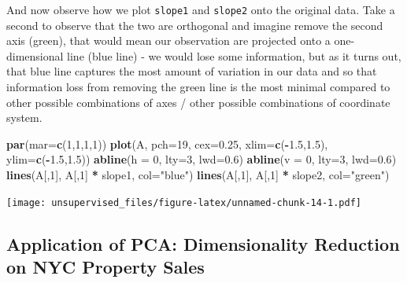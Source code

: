 \documentclass[]{article}
\newenvironment{Shaded}{\begin{snugshade}}{\end{snugshade}}
\newcommand{\DataTypeTok}[1]{\textcolor[rgb]{0.13,0.29,0.53}{#1}}
\newcommand{\DecValTok}[1]{\textcolor[rgb]{0.00,0.00,0.81}{#1}}
\newcommand{\FloatTok}[1]{\textcolor[rgb]{0.00,0.00,0.81}{#1}}
\newcommand{\KeywordTok}[1]{\textcolor[rgb]{0.13,0.29,0.53}{\textbf{#1}}}
\newcommand{\NormalTok}[1]{#1}
\newcommand{\OperatorTok}[1]{\textcolor[rgb]{0.81,0.36,0.00}{\textbf{#1}}}
\newcommand{\StringTok}[1]{\textcolor[rgb]{0.31,0.60,0.02}{#1}}
\begin{document}
And now observe how we plot \texttt{slope1} and \texttt{slope2} onto the
original data. Take a second to observe that the two are orthogonal and
imagine remove the second axis (green), that would mean our observation
are projected onto a one-dimensional line (blue line) - we would lose
some information, but as it turns out, that blue line captures the most
amount of variation in our data and so that information loss from
removing the green line is the most minimal compared to other possible
combinations of axes / other possible combinations of coordinate system.

\begin{Shaded}
\begin{Highlighting}[]
\KeywordTok{par}\NormalTok{(}\DataTypeTok{mar=}\KeywordTok{c}\NormalTok{(}\DecValTok{1}\NormalTok{,}\DecValTok{1}\NormalTok{,}\DecValTok{1}\NormalTok{,}\DecValTok{1}\NormalTok{))}
\KeywordTok{plot}\NormalTok{(A, }\DataTypeTok{pch=}\DecValTok{19}\NormalTok{, }\DataTypeTok{cex=}\FloatTok{0.25}\NormalTok{, }\DataTypeTok{xlim=}\KeywordTok{c}\NormalTok{(}\OperatorTok{-}\FloatTok{1.5}\NormalTok{,}\FloatTok{1.5}\NormalTok{), }\DataTypeTok{ylim=}\KeywordTok{c}\NormalTok{(}\OperatorTok{-}\FloatTok{1.5}\NormalTok{,}\FloatTok{1.5}\NormalTok{))}
\KeywordTok{abline}\NormalTok{(}\DataTypeTok{h =} \DecValTok{0}\NormalTok{, }\DataTypeTok{lty=}\DecValTok{3}\NormalTok{, }\DataTypeTok{lwd=}\FloatTok{0.6}\NormalTok{)}
\KeywordTok{abline}\NormalTok{(}\DataTypeTok{v =} \DecValTok{0}\NormalTok{, }\DataTypeTok{lty=}\DecValTok{3}\NormalTok{, }\DataTypeTok{lwd=}\FloatTok{0.6}\NormalTok{)}
\KeywordTok{lines}\NormalTok{(A[,}\DecValTok{1}\NormalTok{], A[,}\DecValTok{1}\NormalTok{] }\OperatorTok{*}\StringTok{ }\NormalTok{slope1, }\DataTypeTok{col=}\StringTok{"blue"}\NormalTok{)}
\KeywordTok{lines}\NormalTok{(A[,}\DecValTok{1}\NormalTok{], A[,}\DecValTok{1}\NormalTok{] }\OperatorTok{*}\StringTok{ }\NormalTok{slope2, }\DataTypeTok{col=}\StringTok{"green"}\NormalTok{)}
\end{Highlighting}
\end{Shaded}

\texttt{[image: unsupervised\_files/figure-latex/unnamed-chunk-14-1.pdf]}

\hypertarget{application-of-pca-dimensionality-reduction-on-nyc-property-sales}{%
\subsection{Application of PCA: Dimensionality Reduction on NYC Property
Sales}\label{application-of-pca-dimensionality-reduction-on-nyc-property-sales}}
\end{document}

